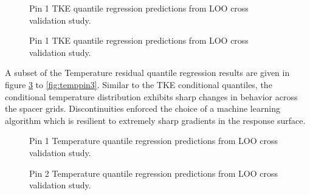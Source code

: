 \begin{figure}[H]%
    \centering
    \qquad
    \caption[Q-Q LOO TKE pin 2 results.]{Pin 1 TKE quantile regression predictions from LOO cross validation study.}%
    \label{fig:tkepin2}%
\end{figure}

\begin{figure}[H]%
    \centering
    \qquad
    \caption[Q-Q LOO TKE pin 3 results.]{Pin 1 TKE quantile regression predictions from LOO cross validation study.}%
    \label{fig:tkepin3}%
\end{figure}


A subset of the Temperature residual quantile regression results are given in figure \ref{fig:temppin1} to \ref{fig:temppin3}.  Similar to the TKE conditional quantiles, the conditional temperature distribution exhibits sharp changes in behavior across the spacer grids.  Discontinuities enforced the choice of a machine learning algorithm which is resilient to extremely sharp gradients in the response surface.

\begin{figure}[H]%
    \centering
    \qquad
    \caption[Q-Q LOO Temperature pin 1 results.]{Pin 1 Temperature quantile regression predictions from LOO cross validation study.}%
    \label{fig:temppin1}%
\end{figure}

\begin{figure}[H]%
    \centering
    \qquad
    \caption[Q-Q LOO Temperature pin 2 results.]{Pin 2 Temperature quantile regression predictions from LOO cross validation study.}%
    \label{fig:temppin2}%
\end{figure}


